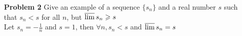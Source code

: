\documentclass[a4paper,12pt]{report}
\begin{document}
\begin{enumerate}
\begin{enumerate}
	\end{enumerate}

\item[\bf{Problem 2}] Give an example of a sequence $\{s_n\}$ and a real number $s$ such that $s_n < s$ for all $n$, but $\varlimsup s_n \geqslant s$ \\
	Let $s_n = -\frac{1}{n}$ and $s = 1$, then $\forall n, s_n < s$ and $\varlimsup s_n = s$
	
	
\end{enumerate}
\end{document}
